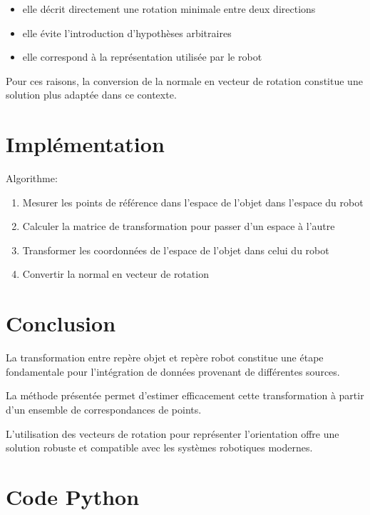 \documentclass[a4paper,11pt]{article}
\begin{document}
\begin{itemize}
\item elle décrit directement une rotation minimale entre deux directions
\item elle évite l'introduction d'hypothèses arbitraires
\item elle correspond à la représentation utilisée par le robot
\end{itemize}

Pour ces raisons, la conversion de la normale en vecteur de rotation constitue une solution plus adaptée dans ce contexte.

\section{Implémentation}

Algorithme:

\begin{enumerate}

\item Mesurer les points de référence dans l'espace de l'objet dans l'espace du robot
\item Calculer la matrice de transformation pour passer d'un espace à l'autre
\item Transformer les coordonnées de l'espace de l'objet dans celui du robot
\item Convertir la normal en vecteur de rotation

\end{enumerate}

\newpage

\section{Conclusion}

La transformation entre repère objet et repère robot constitue une étape fondamentale pour l’intégration de données provenant de différentes sources.

La méthode présentée permet d’estimer efficacement cette transformation à partir d’un ensemble de correspondances de points.

L’utilisation des vecteurs de rotation pour représenter l’orientation offre une solution robuste et compatible avec les systèmes robotiques modernes.

\appendix

\section{Code Python}
\end{document}
